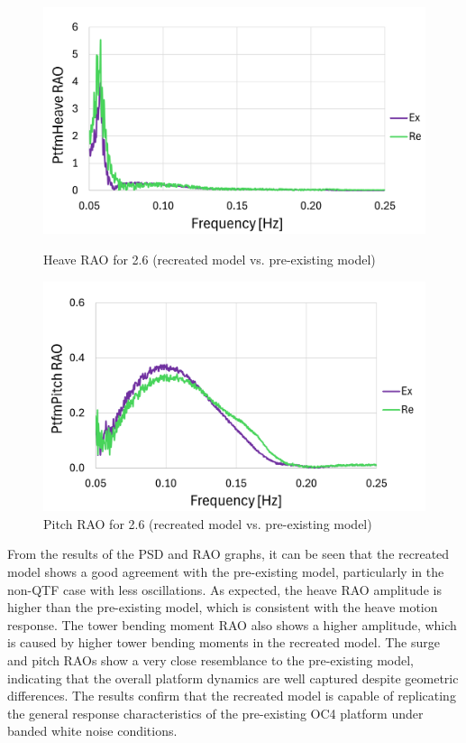 \documentclass[a4paper, 11pt]{article}
\begin{document}
\begin{figure}[H]
    \begin{minipage}{0.48\textwidth}
        \centering
        \includegraphics[width=1\textwidth]{2.6_heave_mine_1.png}
        \caption{\small Heave RAO for 2.6 (recreated model vs. pre-existing model)}
        \label{fig:2.6_heave_mine_recreated}
    \end{minipage}
    \hfill
    \begin{minipage}{0.48\textwidth}
        \centering
        \includegraphics[width=1\textwidth]{2.6_pitch_mine_1.png}
        \caption{\small Pitch RAO for 2.6 (recreated model vs. pre-existing model)}
        \label{fig:2.6_pitch_mine_recreated}
    \end{minipage}
\end{figure}

From the results of the PSD and RAO graphs, it can be seen that the recreated model shows a good agreement with the pre-existing model, particularly in the non-QTF case with less oscillations. As expected, the heave RAO amplitude is higher than the pre-existing model, which is consistent with the heave motion response. The tower bending moment RAO also shows a higher amplitude, which is caused by higher tower bending moments in the recreated model. The surge and pitch RAOs show a very close resemblance to the pre-existing model, indicating that the overall platform dynamics are well captured despite geometric differences. The results confirm that the recreated model is capable of replicating the general response characteristics of the pre-existing OC4 platform under banded white noise conditions.
\end{document}
